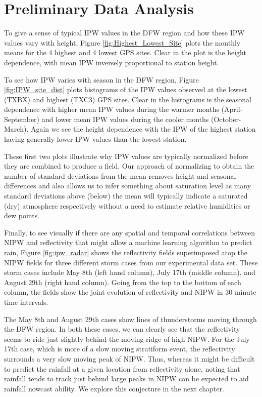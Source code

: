 \documentclass[proposal]{umassthesis}
\begin{document}
\section{Preliminary Data Analysis}

To give a sense of typical IPW values in the DFW region and how these IPW values vary with height, Figure \ref{fig:Highest_Lowest_Site} plots the monthly means for the 4 highest and 4 lowest GPS sites. Clear in the plot is the height dependence, with mean IPW inversely proportional to station height.

To see how IPW varies with season in the DFW region, Figure \ref{fig:IPW_site_dist} plots histograms of the IPW values observed at the lowest (TXBX) and highest (TXC3) GPS sites. Clear in the histograms is the seasonal dependence with higher mean IPW values during the warmer months (April-September) and lower mean IPW values during the cooler months (October-March). Again we see the height dependence with the IPW of the highest station having generally lower IPW values than the lowest station. 

These first two plots illustrate why IPW values are typically normalized before they are combined to produce a field. Our approach of normalizing to obtain the number of standard deviations from the mean removes height and seasonal differences and also allows us to infer something about saturation level as many standard deviations above (below) the mean will typically indicate a saturated (dry) atmosphere respectively without a need to estimate relative humidities or dew points.

Finally, to see visually if there are any spatial and temporal correlations between NIPW and reflectivity that might allow a machine learning algorithm to predict rain, Figure \ref{fig:ipw_radar} shows the reflectivity fields superimposed atop the NIPW fields for three different storm cases from our experimental data set. These storm cases include May 8th (left hand column), July 17th (middle column), and August 29th (right hand column). Going from the top to the bottom of each column, the fields show the joint evolution of reflectivity and NIPW in 30 minute time intervals.

The May 8th and August 29th cases show lines of thunderstorms moving through the DFW region. In both these cases, we can clearly see that the reflectivity seems to ride just slightly behind the moving ridge of high NIPW. For the July 17th case, which is more of a slow moving stratiform event, the reflectivity surrounds a very slow moving peak of NIPW. Thus, whereas it might be difficult to predict the rainfall at a given location from reflectivity alone, noting that rainfall tends to track just behind large peaks in NIPW can be expected to aid rainfall nowcast ability. We explore this conjecture in the next chapter.
\end{document}
